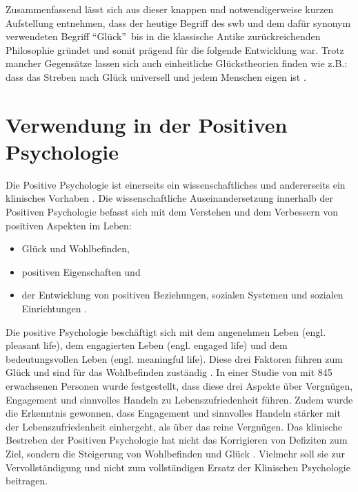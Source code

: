 Zusammenfassend lässt sich aus dieser knappen und notwendigerweise kurzen Aufstellung entnehmen, dass der heutige Begriff des \gls{swb} und dem dafür synonym verwendeten Begriff \textquotedblleft Glück\textquotedblright \ bis in die klassische Antike zurückreichenden Philosophie gründet und somit prägend für die folgende Entwicklung war. Trotz mancher Gegensätze lassen sich auch einheitliche Glückstheorien finden wie z.B.: dass das Streben nach Glück universell und jedem Menschen eigen ist \cite{Becker:1994}. 
  
\section{Verwendung in der Positiven Psychologie}\label{sec.swbPospsy}
Die Positive Psychologie ist einerseits ein wissenschaftliches und andererseits ein klinisches Vorhaben \cite{Carr:2011}. Die wissenschaftliche Auseinandersetzung innerhalb der Positiven Psychologie befasst sich mit dem Verstehen und dem Verbessern von positiven Aspekten im Leben:
\begin{itemize}
\item Glück und Wohlbefinden,
\item positiven Eigenschaften und 
\item der Entwicklung von positiven Beziehungen, sozialen Systemen und sozialen Einrichtungen \cite{Lopez:2009,Seligman:2002}.
\end{itemize}
Die positive Psychologie beschäftigt sich mit dem angenehmen Leben (engl. pleasant life), dem engagierten Leben (engl. engaged life) und dem bedeutungsvollen Leben (engl. meaningful life). Diese drei Faktoren führen zum Glück und sind für das Wohlbefinden zuständig \cite{Carr:2011}. In einer Studie von  mit 845 erwachsenen Personen wurde festgestellt, dass diese drei Aspekte über Vergnügen, Engagement und sinnvolles Handeln zu Lebenszufriedenheit führen. Zudem wurde die Erkenntnis gewonnen, dass Engagement und sinnvolles Handeln stärker mit der Lebenszufriedenheit einhergeht, als über das reine Vergnügen. Das klinische Bestreben der Positiven Psychologie hat nicht das Korrigieren von Defiziten zum Ziel, sondern die Steigerung von Wohlbefinden und Glück \cite{Carr:2011}. Vielmehr soll sie zur Vervollständigung und nicht zum vollständigen Ersatz der Klinischen Psychologie beitragen.
